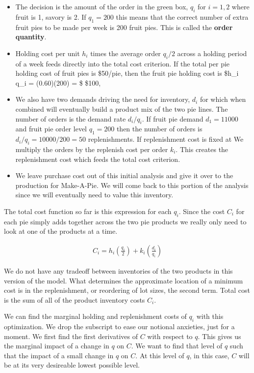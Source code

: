 \documentclass[
]{book}
\begin{document}
\begin{itemize}
\item
  The decision is the amount of the order in the green box, \(q_i\) for \(i=1,2\) where fruit is 1, savory is 2. If \(q_1=200\) this means that the correct number of extra fruit pies to be made per week is 200 fruit pies. This is called the \textbf{order quantity}.
\item
  Holding cost per unit \(h_i\) times the average order \(q_i/2\) across a holding period of a week feeds directly into the total cost criterion. If the total per pie holding cost of fruit pies is \$50/pie, then the fruit pie holding cost is \$h\_i q\_i = (0.60)(200) = \$ \$100,
\item
  We also have two demands driving the need for inventory, \(d_i\) for which when combined will eventually build a product mix of the two pie lines. The number of orders is the demand rate \(d_i/q_i\). If fruit pie demand \(d_1=11000\) and fruit pie order level \(q_1=200\) then the number of orders is \(d_i/q_i=10000/200=50\) replenishments. If replenishment cost is fixed at We multiply the orders by the replenish cost per order \(k_i\). This creates the replenishment cost which feeds the total cost criterion.
\item
  We leave purchase cost out of this initial analysis and give it over to the production for Make-A-Pie. We will come back to this portion of the analysis since we will eventually need to value this inventory.
\end{itemize}

The total cost function so far is this expression for each \(q_i\). Since the cost \(C_i\) for each pie simply adds together across the two pie products we really only need to look at one of the products at a time.

\[
\begin{align}
C_i = h_i\left(\frac{q_i}{2}\right) + k_i\left(\frac{d_i}{q_i}\right)
\end{align}
\]

We do not have any tradeoff between inventories of the two products in this version of the model. What determines the approximate location of a minimum cost is in the replenishment, or reordering of lot sizes, the second term. Total cost is the sum of all of the product inventory costs \(C_i\).

We can find the marginal holding and replenishment costs of \(q_i\) with this optimization. We drop the subscript to ease our notional anxieties, just for a moment. We first find the first derivatives of \(C\) with respect to \(q\). This gives us the marginal impact of a change in \(q\) on \(C\). We want to find that level of \(q\) such that the impact of a small change in \(q\) on \(C\). At this level of \(q\), in this case, \(C\) will be at its very desireable lowest possible level.
\end{document}
